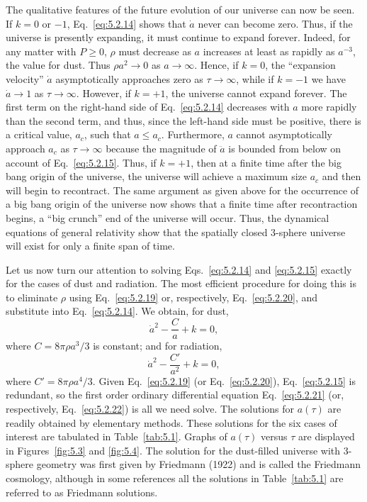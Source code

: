 The qualitative features of the future evolution of our universe can now be seen. If
\(k=0\) or \(-1\), Eq.~\eqref{eq:5.2.14} shows that \(\dot a\) never can become
zero. Thus, if the universe is presently expanding, it must continue to expand forever.
Indeed, for any matter with \(P\geq0\), \(\rho\) must decrease as \(a\) increases at
least as rapidly as \(a^{-3}\), the value for dust. Thus \(\rho a^2\to0\) as
\(a\to\infty\). Hence, if \(k=0\), the ``expansion velocity'' \(\dot a\)
asymptotically approaches zero as \(\tau\to\infty\), while if \(k=-1\) we have
\(\dot a\to1\) as \(\tau\to\infty\). However, if \(k=+1\), the universe cannot
expand forever. The first term on the right-hand side of Eq.~\eqref{eq:5.2.14}
decreases with \(a\) more rapidly than the second term, and thus, since the left-hand
side must be positive, there is a critical value, \(a_c\), such that \(a\leq a_c\).
Furthermore, \(a\) cannot asymptotically approach \(a_c\) as \(\tau\to\infty\)
because the magnitude of \(\ddot a\) is bounded from below on account of
Eq.~\eqref{eq:5.2.15}. Thus, if \(k=+1\), then at a finite time after the big bang
origin of the universe, the universe will achieve a maximum size \(a_c\) and then
will begin to recontract. The same argument as given above for the occurrence of a
big bang origin of the universe now shows that a finite time after recontraction
begins, a ``big crunch'' end of the universe will occur. Thus, the dynamical equations
of general relativity show that the spatially closed 3-sphere universe will exist for
only a finite span of time.

Let us now turn our attention to solving Eqs.~\eqref{eq:5.2.14} and
\eqref{eq:5.2.15} exactly for the cases of dust and radiation. The most efficient
procedure for doing this is to eliminate \(\rho\) using Eq.~\eqref{eq:5.2.19} or,
respectively, Eq.~\eqref{eq:5.2.20}, and substitute into Eq.~\eqref{eq:5.2.14}. We
obtain, for dust,
\begin{equation}
  \dot a^2-\frac{C}{a}+k=0,
  \tag{5.2.21}\label{eq:5.2.21}
\end{equation}
where \(C=8\pi\rho a^3/3\) is constant; and for radiation,
\begin{equation}
  \dot a^2-\frac{C'}{a^2}+k=0,
  \tag{5.2.22}\label{eq:5.2.22}
\end{equation}
where \(C'=8\pi\rho a^4/3\). Given Eq.~\eqref{eq:5.2.19} (or
Eq.~\eqref{eq:5.2.20}), Eq.~\eqref{eq:5.2.15} is redundant, so the first order
ordinary differential equation Eq.~\eqref{eq:5.2.21} (or, respectively,
Eq.~\eqref{eq:5.2.22}) is all we need solve. The solutions for \(a(\tau)\) are
readily obtained by elementary methods. These solutions for the six cases of interest
are tabulated in Table~\ref{tab:5.1}. Graphs of \(a(\tau)\) versus \(\tau\) are
displayed in Figures~\ref{fig:5.3} and \ref{fig:5.4}. The solution for the dust-filled
universe with 3-sphere geometry was first given by Friedmann (1922) and is called
the Friedmann cosmology, although in some references all the solutions in
Table~\ref{tab:5.1} are referred to as Friedmann solutions.



